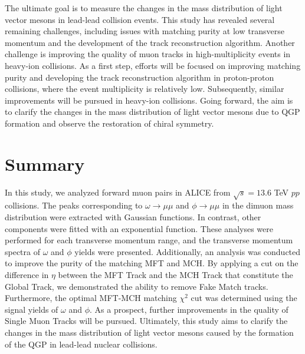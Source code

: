     The ultimate goal is to measure the changes in the mass distribution of light vector mesons in lead-lead collision events. This study has revealed several remaining challenges, including issues with matching purity at low transverse momentum and the development of the track reconstruction algorithm. Another challenge is improving the quality of muon tracks in high-multiplicity events in heavy-ion collisions. As a first step, efforts will be focused on improving matching purity and developing the track reconstruction algorithm in proton-proton collisions, where the event multiplicity is relatively low. 
    Subsequently, similar improvements will be pursued in heavy-ion collisions. 
    Going forward, the aim is to clarify the changes in the mass distribution of light vector mesons due to QGP formation and observe the restoration of chiral symmetry.
\section{Summary}
    In this study, we analyzed forward muon pairs in ALICE from $\sqrt{s} = 13.6$ TeV $pp$ collisions. 
    The peaks corresponding to $\omega \rightarrow \mu\mu$ and $\phi \rightarrow \mu\mu$ in the dimuon mass distribution were extracted with Gaussian functions. In contrast, other components were fitted with an exponential function. 
    These analyses were performed for each transverse momentum range, and the transverse momentum spectra of $\omega$ and $\phi$ yields were presented. 
    Additionally, an analysis was conducted to improve the purity of the matching MFT and MCH.
    By applying a cut on the difference in $\eta$ between the MFT Track and the MCH Track that constitute the Global Track, we demonstrated the ability to remove Fake Match tracks.
    Furthermore, the optimal MFT-MCH matching $\chi^2$ cut was determined using the signal yields of $\omega$ and $\phi$.
    As a prospect, further improvements in the quality of Single Muon Tracks will be pursued. Ultimately, this study aims to clarify the changes in the mass distribution of light vector mesons caused by the formation of the QGP in lead-lead nuclear collisions.
